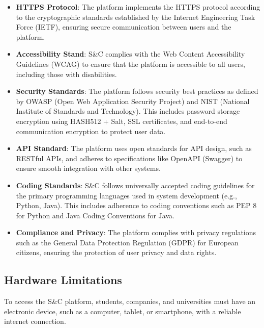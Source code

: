 \begin{itemize}
    \item \textbf{HTTPS Protocol}: The platform implements the HTTPS protocol according to the cryptographic standards established by the Internet Engineering Task Force (IETF), ensuring secure communication between users and the platform.

    \item \textbf{Accessibility Stand}: S\&C complies with the Web Content Accessibility Guidelines (WCAG) to ensure that the platform is accessible to all users, including those with disabilities.

    \item \textbf{Security Standards}: The platform follows security best practices as defined by OWASP (Open Web Application Security Project) and NIST (National Institute of Standards and Technology). This includes password storage encryption using HASH512 + Salt, SSL certificates, and end-to-end communication encryption to protect user data.

    \item \textbf{API Standard}:  The platform uses open standards for API design, such as RESTful APIs, and adheres to specifications like OpenAPI (Swagger) to ensure smooth integration with other systems.

    \item \textbf{Coding Standards}: S\&C follows universally accepted coding guidelines for the primary programming languages used in system development (e.g., Python, Java). This includes adherence to coding conventions such as PEP 8 for Python and Java Coding Conventions for Java.

    \item \textbf{Compliance and Privacy}: The platform complies with privacy regulations such as the General Data Protection Regulation (GDPR) for European citizens, ensuring the protection of user privacy and data rights.
    
\end{itemize}

\pagebreak
\subsection{Hardware Limitations}

To access the S\&C platform, students, companies, and universities must have an electronic device, such as a computer, tablet, or smartphone, with a reliable internet connection. 

